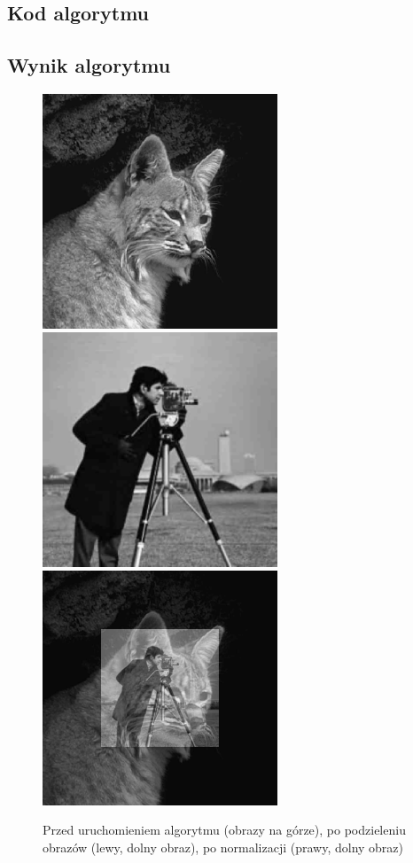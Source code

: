 \documentclass[a4paper,12pt]{book}
\begin{document}
\subsection*{Kod algorytmu}

\subsection*{Wynik algorytmu}
\begin{figure}[H]
	\caption{Przed uruchomieniem algorytmu (obrazy na górze), po podzieleniu obrazów (lewy, dolny obraz), po normalizacji (prawy, dolny obraz)}
	\includegraphics[width=7cm, height=7cm]{cat-unmodified.jpg}
	\includegraphics[width=7cm, height=7cm]{man-unmodified.jpg}
	\includegraphics[width=7cm, height=7cm]{2-5/divide-gray-images-cat-photoman.png}

\end{figure}
\end{document}
